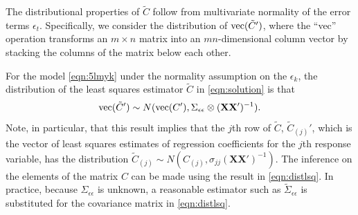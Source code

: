 The distributional properties of $\tilde{C}$ follow from multivariate normality of the error terms $\epsilon_t$. Specifically, we consider the distribution of $\operatorname{vec}(\tilde{C}')$, where the ``vec'' operation transforms an $m \times n$ matrix into an $mn$-dimensional column vector by stacking the columns of the matrix below each other. 


\setcounter{result}{0}
\begin{result} \label{res:1}
For the model \eqref{eqn:5lmyk} under the normality assumption on the $\epsilon_k$,  the distribution of the least squares estimator $\tilde{C}$ in \eqref{eqn:solution} is that 
	\begin{equation} \label{eqn:distlsq}
	\tvec(\tilde{C}') \sim N(\tvec(C'), \Sigma_{\epsilon\epsilon} \otimes (\mathbf{X} \mathbf{X}')^{-1}).
	\end{equation}
Note, in particular, that this result implies that the $j$th row of $\tilde{C}$, $\tilde{C}_{(j)}'$, which is the vector of least squares estimates of regression coefficients for the $j$th response variable, has the distribution $\tilde{C}_{(j)} \sim N(C_{(j)}, \sigma_{jj}( \mathbf{X} \mathbf{X}')^{-1} )$. The inference on the elements of the matrix $C$ can be made using the result in \eqref{eqn:distlsq}. In practice, because $\Sigma_{\epsilon\epsilon}$ is unknown, a reasonable estimator such as $\tilde{\Sigma}_{\epsilon\epsilon}$ is substituted for the covariance matrix in \eqref{eqn:distlsq}.



\end{result}
